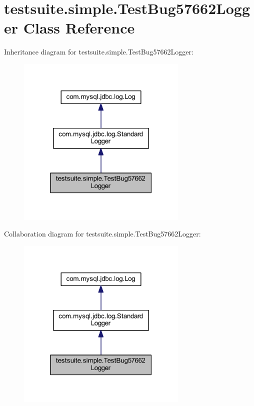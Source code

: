 \hypertarget{classtestsuite_1_1simple_1_1_test_bug57662_logger}{}\section{testsuite.\+simple.\+Test\+Bug57662\+Logger Class Reference}
\label{classtestsuite_1_1simple_1_1_test_bug57662_logger}


Inheritance diagram for testsuite.\+simple.\+Test\+Bug57662\+Logger\+:
\nopagebreak
\begin{figure}[H]
\begin{center}
\leavevmode
\includegraphics[width=231pt]{classtestsuite_1_1simple_1_1_test_bug57662_logger__inherit__graph}
\end{center}
\end{figure}


Collaboration diagram for testsuite.\+simple.\+Test\+Bug57662\+Logger\+:
\nopagebreak
\begin{figure}[H]
\begin{center}
\leavevmode
\includegraphics[width=231pt]{classtestsuite_1_1simple_1_1_test_bug57662_logger__coll__graph}
\end{center}
\end{figure}
